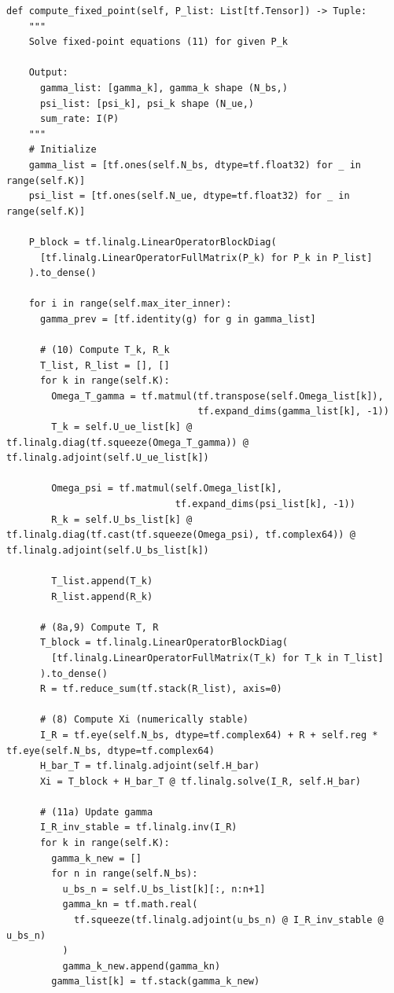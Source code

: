 \documentclass[10pt]{article}
\begin{document}
\begin{lstlisting}[caption={Fixed-Point Computation Method}]
  def compute_fixed_point(self, P_list: List[tf.Tensor]) -> Tuple:
    """
    Solve fixed-point equations (11) for given P_k
    
    Output:
      gamma_list: [gamma_k], gamma_k shape (N_bs,)
      psi_list: [psi_k], psi_k shape (N_ue,)
      sum_rate: I(P)
    """
    # Initialize
    gamma_list = [tf.ones(self.N_bs, dtype=tf.float32) for _ in range(self.K)]
    psi_list = [tf.ones(self.N_ue, dtype=tf.float32) for _ in range(self.K)]
    
    P_block = tf.linalg.LinearOperatorBlockDiag(
      [tf.linalg.LinearOperatorFullMatrix(P_k) for P_k in P_list]
    ).to_dense()
    
    for i in range(self.max_iter_inner):
      gamma_prev = [tf.identity(g) for g in gamma_list]
      
      # (10) Compute T_k, R_k
      T_list, R_list = [], []
      for k in range(self.K):
        Omega_T_gamma = tf.matmul(tf.transpose(self.Omega_list[k]), 
                                  tf.expand_dims(gamma_list[k], -1))
        T_k = self.U_ue_list[k] @ tf.linalg.diag(tf.squeeze(Omega_T_gamma)) @ tf.linalg.adjoint(self.U_ue_list[k])
        
        Omega_psi = tf.matmul(self.Omega_list[k], 
                              tf.expand_dims(psi_list[k], -1))
        R_k = self.U_bs_list[k] @ tf.linalg.diag(tf.cast(tf.squeeze(Omega_psi), tf.complex64)) @ tf.linalg.adjoint(self.U_bs_list[k])
        
        T_list.append(T_k)
        R_list.append(R_k)
      
      # (8a,9) Compute T, R
      T_block = tf.linalg.LinearOperatorBlockDiag(
        [tf.linalg.LinearOperatorFullMatrix(T_k) for T_k in T_list]
      ).to_dense()
      R = tf.reduce_sum(tf.stack(R_list), axis=0)
      
      # (8) Compute Xi (numerically stable)
      I_R = tf.eye(self.N_bs, dtype=tf.complex64) + R + self.reg * tf.eye(self.N_bs, dtype=tf.complex64)
      H_bar_T = tf.linalg.adjoint(self.H_bar)
      Xi = T_block + H_bar_T @ tf.linalg.solve(I_R, self.H_bar)
      
      # (11a) Update gamma
      I_R_inv_stable = tf.linalg.inv(I_R)
      for k in range(self.K):
        gamma_k_new = []
        for n in range(self.N_bs):
          u_bs_n = self.U_bs_list[k][:, n:n+1]
          gamma_kn = tf.math.real(
            tf.squeeze(tf.linalg.adjoint(u_bs_n) @ I_R_inv_stable @ u_bs_n)
          )
          gamma_k_new.append(gamma_kn)
        gamma_list[k] = tf.stack(gamma_k_new)
      

\end{lstlisting}
\end{document}
